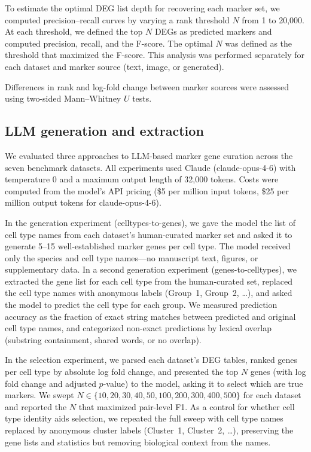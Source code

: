 \documentclass[10pt,twocolumn]{article}
\theoremstyle{plain}
\theoremstyle{definition}
\theoremstyle{remark}
\begin{document}
To estimate the optimal DEG list depth for recovering each marker set, we computed precision--recall curves by varying a rank threshold $N$ from 1 to 20{,}000. At each threshold, we defined the top $N$ DEGs as predicted markers and computed precision, recall, and the F-score. The optimal $N$ was defined as the threshold that maximized the F-score. This analysis was performed separately for each dataset and marker source (text, image, or generated).

Differences in rank and log-fold change between marker sources were assessed using two-sided Mann--Whitney $U$ tests.


\subsection{LLM generation and extraction}

We evaluated three approaches to LLM-based marker gene curation across the seven benchmark datasets. All experiments used Claude (claude-opus-4-6) with temperature 0 and a maximum output length of 32{,}000 tokens. Costs were computed from the model's API pricing (\$5 per million input tokens, \$25 per million output tokens for claude-opus-4-6).

In the generation experiment (celltypes-to-genes), we gave the model the list of cell type names from each dataset's human-curated marker set and asked it to generate 5--15 well-established marker genes per cell type. The model received only the species and cell type names---no manuscript text, figures, or supplementary data. In a second generation experiment (genes-to-celltypes), we extracted the gene list for each cell type from the human-curated set, replaced the cell type names with anonymous labels (Group~1, Group~2, \ldots), and asked the model to predict the cell type for each group. We measured prediction accuracy as the fraction of exact string matches between predicted and original cell type names, and categorized non-exact predictions by lexical overlap (substring containment, shared words, or no overlap).

In the selection experiment, we parsed each dataset's DEG tables, ranked genes per cell type by absolute log fold change, and presented the top $N$ genes (with log fold change and adjusted $p$-value) to the model, asking it to select which are true markers. We swept $N \in \{10, 20, 30, 40, 50, 100, 200, 300, 400, 500\}$ for each dataset and reported the $N$ that maximized pair-level F1. As a control for whether cell type identity aids selection, we repeated the full sweep with cell type names replaced by anonymous cluster labels (Cluster~1, Cluster~2, \ldots), preserving the gene lists and statistics but removing biological context from the names.
\end{document}
